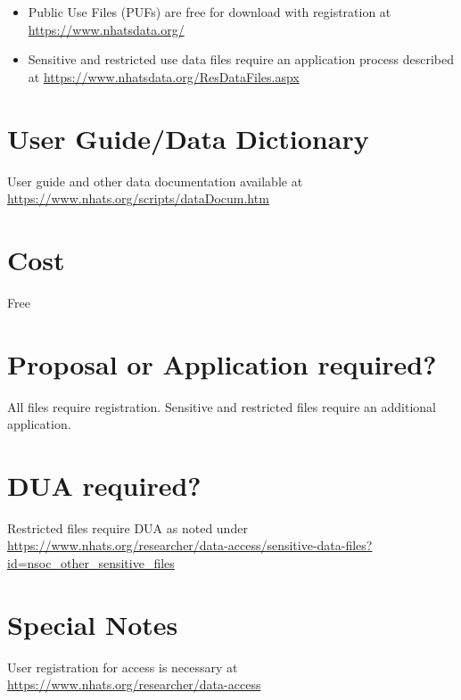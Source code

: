 \documentclass[
]{book}
\providecommand{\tightlist}{%
  \setlength{\itemsep}{0pt}\setlength{\parskip}{0pt}}
\begin{document}
\begin{itemize}
\tightlist
\item
  Public Use Files (PUFs) are free for download with registration at \url{https://www.nhatsdata.org/}
\item
  Sensitive and restricted use data files require an application process described at \url{https://www.nhatsdata.org/ResDataFiles.aspx}
\end{itemize}

\hypertarget{user-guidedata-dictionary-49}{%
\section{User Guide/Data Dictionary}\label{user-guidedata-dictionary-49}}

User guide and other data documentation available at \url{https://www.nhats.org/scripts/dataDocum.htm}

\hypertarget{cost-49}{%
\section{Cost}\label{cost-49}}

Free

\hypertarget{proposal-or-application-required-49}{%
\section{Proposal or Application required?}\label{proposal-or-application-required-49}}

All files require registration. Sensitive and restricted files require an additional application.

\hypertarget{dua-required-49}{%
\section{DUA required?}\label{dua-required-49}}

Restricted files require DUA as noted under \url{https://www.nhats.org/researcher/data-access/sensitive-data-files?id=nsoc_other_sensitive_files}

\hypertarget{special-notes-49}{%
\section{Special Notes}\label{special-notes-49}}

User registration for access is necessary at \url{https://www.nhats.org/researcher/data-access}
\end{document}
